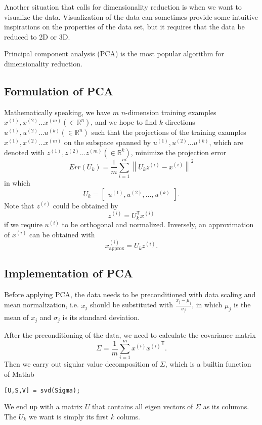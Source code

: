 Another situation that calls for dimensionality reduction is when we want to visualize the data. Visualization of the data can sometimes provide some intuitive inspirations on the properties of the data set, but it requires that the data be reduced to 2D or 3D.

Principal component analysis (PCA) is the most popular algorithm for dimensionality reduction.
\subsection{Formulation of PCA}
Mathematically speaking, we have $m$ $n$-dimension training examples \\$x^{(1)},x^{(2)}\dots x^{(m)}(\in \mathbb{R}^n)$, and we hope to find $k$ directions $u^{(1)},u^{(2)}\dots u^{(k)}(\in \mathbb{R}^n)$ such that the projections of the training examples $x^{(1)},x^{(2)}\dots x^{(m)}$ on the subspace spanned by $u^{(1)},u^{(2)}\dots u^{(k)}$, which are denoted with $z^{(1)},z^{(2)}\dots z^{(m)}(\in \mathbb{R}^k)$, minimize the projection error
\begin{equation}
Err(U_k) = \frac{1}{m}\sum\limits_{i=1}^m\left\lVert U_kz^{(i)} - x^{(i)}\right\rVert^2
\end{equation}
in which 
\begin{equation*}
U_k = \begin{bmatrix}
u^{(1)}, u^{(2)},\dots,u^{(k)}
\end{bmatrix}.
\end{equation*}
Note that $z^{(i)}$ could be obtained by 
$$z^{(i)} = U_k^{\mathsf T}x^{(i)}$$
if we require $u^{(i)}$ to be orthogonal and normalized. Inversely, an approximation of $x^{(i)}$ can be obtained with
$$x^{(i)}_{\text{approx}} = U_kz^{(i)}.$$
\subsection{Implementation of PCA}
Before applying PCA, the data needs to be preconditioned with data scaling and mean normalization, i.e. $x_j$ should be substituted with $\frac{x_j-\mu_j}{\sigma_j}$, in which $\mu_j$ is the mean of $x_j$ and $\sigma_j$ is its standard deviation.

After the preconditioning of the data, we need to calculate the covariance matrix
\begin{equation}
\Sigma = \frac{1}{m}\sum\limits_{i=1}^{m}x^{(i)}{x^{(i)}}^{\mathsf T}.
\end{equation}
Then we carry out sigular value decomposition of $\Sigma$, which is a builtin function of Matlab
\begin{lstlisting}
[U,S,V] = svd(Sigma);
\end{lstlisting}
We end up with a matrix $U$ that contains all eigen vectors of $\Sigma$ as its columns. The $U_k$ we want is simply its first $k$ colums.

